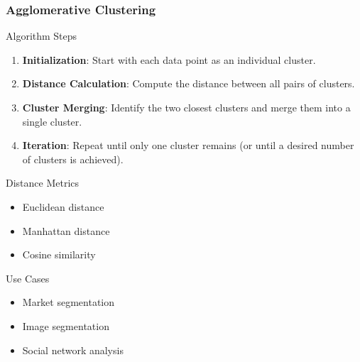 \documentclass[aspectratio=169]{beamer}
\begin{document}
\begin{frame}[fragile]
    \frametitle{Agglomerative Clustering}
    \begin{block}{Algorithm Steps}
        \begin{enumerate}
            \item \textbf{Initialization}: Start with each data point as an individual cluster.
            \item \textbf{Distance Calculation}: Compute the distance between all pairs of clusters.
            \item \textbf{Cluster Merging}: Identify the two closest clusters and merge them into a single cluster.
            \item \textbf{Iteration}: Repeat until only one cluster remains (or until a desired number of clusters is achieved).
        \end{enumerate}
    \end{block}

    \begin{block}{Distance Metrics}
        \begin{itemize}
            \item Euclidean distance
            \item Manhattan distance
            \item Cosine similarity
        \end{itemize}
    \end{block}

    \begin{block}{Use Cases}
        \begin{itemize}
            \item Market segmentation
            \item Image segmentation
            \item Social network analysis
        \end{itemize}
    \end{block}
\end{frame}
\end{document}
